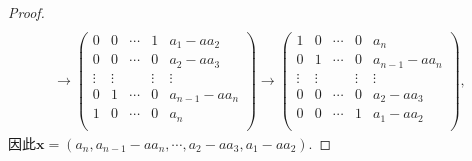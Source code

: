 \documentclass[../../main.tex]{subfiles}%
\begin{document}
\begin{proof}
\begin{gather*}
\\
\rightarrow \left( \begin{matrix}
0&		0&		\cdots&		1&		a_1-aa_2\\
0&		0&		\cdots&		0&		a_2-aa_3\\
\vdots&		\vdots&		&		\vdots&		\vdots\\
0&		1&		\cdots&		0&		a_{n-1}-aa_n\\
1&		0&		\cdots&		0&		a_n\\
\end{matrix} \right) \rightarrow \left( \begin{matrix}
1&		0&		\cdots&		0&		a_n\\
0&		1&		\cdots&		0&		a_{n-1}-aa_n\\
\vdots&		\vdots&		&		\vdots&		\vdots\\
0&		0&		\cdots&		0&		a_2-aa_3\\
0&		0&		\cdots&		1&		a_1-aa_2\\
\end{matrix} \right),
\end{gather*}
因此\(\boldsymbol{x}=(a_n,a_{n - 1} - a a_n,\cdots,a_2 - a a_3,a_1 - a a_2)\).

\end{proof}
\end{document}
